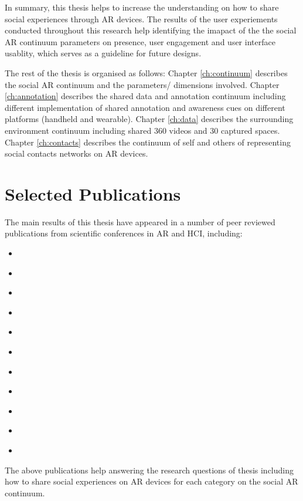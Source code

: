 In summary, this thesis helps to increase the understanding on how to share social experiences through AR devices. The results of the user experiements conducted throughout this research help identifying the imapact of the the social AR continuum parameters on presence, user engagement and user interface usablity, which serves as a guideline for future designs. 

The rest of the thesis is organised as follows: Chapter \ref{ch:continuum} describes the social AR continuum and the parameters/ dimensions involved. Chapter \ref{ch:annotation} describes the shared data and annotation continuum including different implementation of shared annotation and awareness cues on different platforms (handheld and wearable). Chapter \ref{ch:data} describes the surrounding environment continuum including shared 360 videos and 30 captured spaces. Chapter \ref{ch:contacts} describes the continuum of self and others of representing social contacts networks on AR devices. 

\section{Selected Publications}

The main results of this thesis have appeared in a number of peer reviewed publications from scientific conferences in AR and HCI, including: 

\begin{itemize}
    \item{ }
    \item{ }
    \item{ }
    \item{ }    
    \item{ }
    \item{ }
    \item{ }
    \item{ }
    \item{ }
    \item{ }
    \item{ }
\end{itemize}

The above publications help answering the research questions of thesis including how to share social experiences on AR devices for each category on the social AR continuum. 



